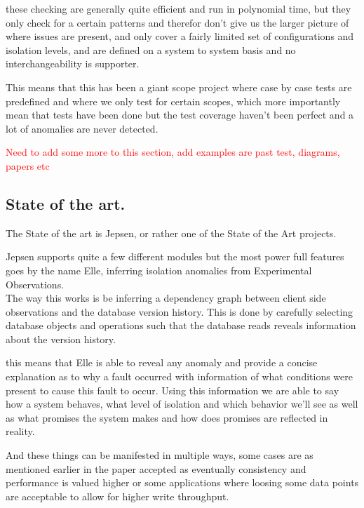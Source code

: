 \documentclass[a4paper,10pt,titlepage]{report}
\begin{document}
these checking are generally quite efficient and run in polynomial time, but they only check for a certain patterns and therefor don't give us the larger picture of where issues are present, and only cover a fairly limited set of configurations and isolation levels, and are defined on a system to system basis and no interchangeability is supporter.

This means that this has been a giant scope project where case by case tests are predefined and where we only test for certain scopes, which more importantly mean that tests have been done but the test coverage haven't been perfect and a lot of anomalies are never detected.

\textcolor{red}{Need to add some more to this section, add examples are past test, diagrams, papers etc}

\subsection{State of the art.}

The State of the art is Jepsen, or rather one of the State of the Art projects.

Jepsen supports quite a few different modules but the most power full features goes by the name Elle, inferring isolation anomalies from Experimental Observations. \\

The way this works is be inferring a dependency graph between client side observations and the database version history. This is done by carefully selecting database objects and operations such that the database reads reveals information about the version history. 

this means that Elle is able to reveal any anomaly and provide a concise explanation as to why a fault occurred with information of what conditions were present to cause this fault to occur. Using this information we are able to say how a system behaves, what level of isolation and which behavior we'll see as well as what promises the system makes and how does promises are reflected in reality.

And these things can be manifested in multiple ways, some cases are as mentioned earlier in the paper accepted as eventually consistency and performance is valued higher or some applications where loosing some data points are acceptable to allow for higher write throughput.
\end{document}
